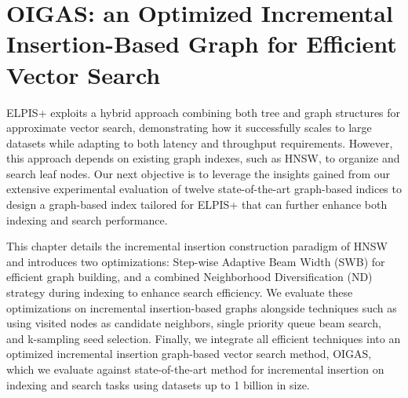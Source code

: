 \chapter{OIGAS: an Optimized Incremental
Insertion-Based Graph for Efficient Vector Search}
\label{chapter:oigas}
ELPIS+ exploits a hybrid approach combining both tree and graph structures for approximate vector search, demonstrating how it successfully scales to large datasets while adapting to both latency and throughput requirements. However, this approach depends on existing graph indexes, such as HNSW, to organize and search leaf nodes. Our next objective is to leverage the insights gained from our extensive experimental evaluation of twelve state-of-the-art graph-based indices to design a graph-based index tailored for ELPIS+ that can further enhance both indexing and search performance.

This chapter details the incremental insertion construction paradigm of HNSW and introduces two optimizations: Step-wise Adaptive Beam Width (SWB) for efficient graph building, and a combined Neighborhood Diversification (ND) strategy during indexing to enhance search efficiency. We evaluate these optimizations on incremental insertion-based graphs alongside techniques such as using visited nodes as candidate neighbors, single priority queue beam search, and k-sampling seed selection. Finally, we integrate all efficient techniques into an optimized incremental insertion graph-based vector search method, OIGAS, which we evaluate against state-of-the-art method for incremental insertion on indexing and search tasks using datasets up to 1 billion in size.

